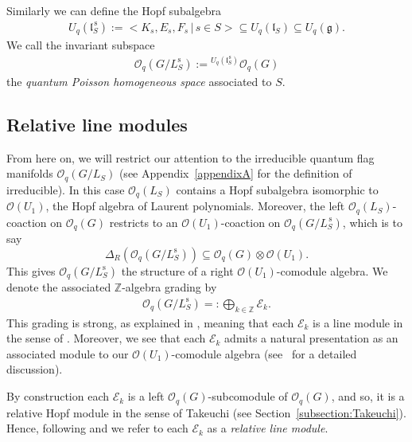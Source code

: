 \documentclass[pdftex]{sigma}
\numberwithin{equation}{section}
\newcommand{\usslevi}{U_q(\mathfrak{l}^{\,\mathrm{s}}_S)}
\begin{document}
Similarly we can define the Hopf subalgebra
\begin{align*}
\usslevi := \big< K_s, E_s, F_s \,|\, s \in S \big> \subseteq U_q(\mathfrak{l}_S) \subseteq U_q(\mathfrak{g}).
\end{align*}
We call the invariant subspace
\begin{align*}
\mathcal{O}_q(G/L^{\mathrm{s}}_S):= {}^{U_q(\mathfrak{l}^{\,\mathrm{s}}_S)} \mathcal{O}_q(G)
\end{align*}
the \emph{quantum Poisson homogeneous space} associated to $S$.

\subsection{Relative line modules}\label{section2.6}

From here on, we will restrict our attention to the irreducible quantum flag manifolds $\mathcal{O}_q(G/L_S)$ (see Appendix~\ref{appendixA} for the definition of irreducible). In this case $\mathcal{O}_q(L_S)$ contains a Hopf subalgebra isomorphic to $\mathcal{O}(U_1)$, the Hopf algebra of Laurent polynomials.
Moreover, the left $\mathcal{O}_q(L_S)$-coaction on $\mathcal{O}_q(G)$ restricts to an $\mathcal{O}(U_1)$-coaction on $\mathcal{O}_q(G/L^{\,\mathrm{s}}_S)$, which is to say
\[
\Delta_{R}(\mathcal{O}_q(G/L^{\mathrm{s}}_S)) \subseteq \mathcal{O}_q(G) \otimes \mathcal{O}(U_1).
\]
This gives $\mathcal{O}_q(G/L^{\mathrm{s}}_S)$ the structure of a right $\mathcal{O}(U_1)$-comodule algebra. We denote the associated $\mathbb{Z}$-algebra grading by
\begin{gather}\label{eqn:linebundeldecomp}
\mathcal{O}_q(G/L^{\mathrm{s}}_S) =: \bigoplus_{k\in \mathbb{Z}} \mathcal{E}_k.
\end{gather}
This grading is strong, as explained in \cite[Section~4]{GAPP}, meaning that each $\mathcal{E}_k$ is a line module in the sense of \cite[Section~3.5]{BeggsMajid:Leabh}. Moreover, we see that each $\mathcal{E}_k$ admits a natural presentation as an associated module to our $\mathcal{O}(U_1)$-comodule algebra (see~\cite[Section~5]{GAPP} for a detailed discussion).

By construction each $\mathcal{E}_k$ is a left $\mathcal{O}_q(G)$-subcomodule of $\mathcal{O}_q(G)$, and so, it is a relative Hopf module in the sense of Takeuchi (see Section~\ref{subsection:Takeuchi}). Hence, following \cite[Section~3.1]{DOKSS} and \cite[Section~2.3]{GAPP} we refer to each $\mathcal{E}_k$ as a \emph{relative line module}.
\end{document}
